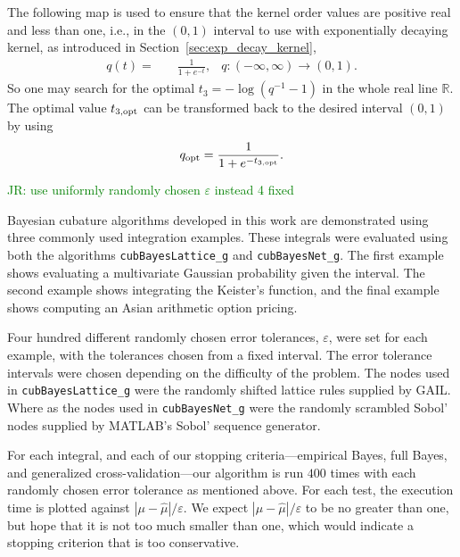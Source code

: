 \documentclass{iitthesis}          %
\newcommand{\reals}{\mathbb{R}}
\newcommand{\hmu}{\widehat{\mu}}
\newcommand{\code}[1]{\texttt{#1}}
\def\abs#1{\ensuremath{\left \lvert #1 \right \rvert}}
\newcommand\secref{Section~\ref}
\newcommand{\JRNote}[1]{{\textcolor{green}{JR: #1}}}
\begin{document}
The following map is used to ensure that the kernel order values are positive real and less than one, i.e., in the $(0,1)$ interval to use with exponentially decaying kernel, as introduced in \secref{sec:exp_decay_kernel},
\begin{align*}
q(t) = & \quad \frac{1}{1 + e^{-t}}, & q: (-\infty, \infty) \to (0, 1).
\end{align*}
So one may search for the optimal $t_3 = -\log(q^{-1}-1)$ in the whole real line $\reals$.
The optimal value $t_{3, \textup{opt}}$ can be transformed back to the desired interval $(0,1)$ by using
\begin{align*}
q_{\textup{opt}} = \frac{1}{1 + e^{-t_{3, \textup{opt}}}}.
\end{align*}



\clearpage



\label{sec:NumExp}

\JRNote{use uniformly randomly chosen $\varepsilon$ instead 4 fixed}

Bayesian cubature algorithms developed in this work are demonstrated using three commonly used integration examples.
These integrals were evaluated using both the algorithms \code{cubBayesLattice\_g} and \code{cubBayesNet\_g}. The first example shows evaluating a multivariate Gaussian probability given the interval. The second example shows integrating the Keister's function, and the final example shows computing an Asian arithmetic option pricing.  

\label{sec:numerical_experiments_cubBayesLattice}

Four hundred different randomly chosen error tolerances, $\varepsilon$,  were set for each example, with the tolerances chosen from a fixed interval. 
The error tolerance intervals were chosen depending on the difficulty of the problem.
The nodes used in \allowbreak \code{cubBayesLattice\_g} were the randomly shifted lattice rules supplied by GAIL.  
Where as the nodes used in \code{cubBayesNet\_g} were the randomly scrambled Sobol' nodes supplied by MATLAB's Sobol' sequence generator. 

For each integral, and each of our stopping criteria---empirical Bayes, full Bayes, and generalized cross-validation---our algorithm is run  $400$ times with each randomly chosen error tolerance as mentioned above.  For each test, the execution time is plotted against $\abs{\mu - \hmu}/\varepsilon$.  We expect $\abs{\mu - \hmu}/\varepsilon$ to be no greater than one, but hope that it is not too much smaller than one, which would indicate a stopping criterion that is too conservative.
\end{document}
